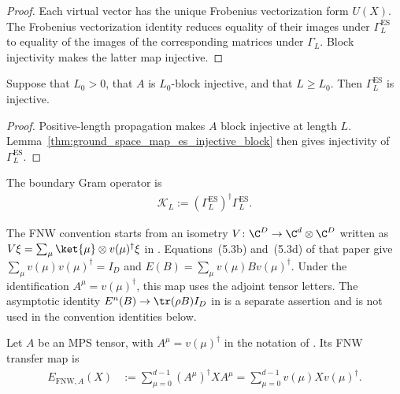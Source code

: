 \begin{proof}
    \leanok
    Each virtual vector has the unique Frobenius vectorization form $U(X)$.
    The Frobenius vectorization identity reduces equality of their images under
    $\Gamma_L^{\mathrm{ES}}$ to equality of the images of the corresponding
    matrices under $\Gamma_L$.  Block injectivity makes the latter map
    injective.
\end{proof}

\begin{lemma}
    \label{thm:ground_space_map_es_injective_block_of_le}
    \leanok
    Suppose that $L_0>0$, that $A$ is $L_0$-block injective, and that
    $L\ge L_0$.  Then $\Gamma_L^{\mathrm{ES}}$ is injective.
\end{lemma}

\begin{proof}
    \leanok
    Positive-length propagation makes $A$ block injective at length $L$.
    Lemma~\ref{thm:ground_space_map_es_injective_block} then gives injectivity of
    $\Gamma_L^{\mathrm{ES}}$.
\end{proof}

\begin{definition}
    \label{def:ground_space_gram}
    \leanok
    The boundary Gram operator is
    \begin{align}
        \mathcal K_L
        :=(\Gamma_L^{\mathrm{ES}})^\dagger\Gamma_L^{\mathrm{ES}}.
    \end{align}
\end{definition}

The FNW convention starts from an isometry
$V\colon\C^D\to\C^d\otimes\C^D$ written as
$V\xi=\sum_\mu\ket{\mu}\otimes v(\mu)^\dagger\xi$ in
\cite[Equation~(5.2)]{Fannes1992Finitely}. Equations~(5.3b) and~(5.3d)
of that paper give
$\sum_\mu v(\mu)v(\mu)^\dagger=I_D$ and
$E(B)=\sum_\mu v(\mu)Bv(\mu)^\dagger$. Under the identification
$A^\mu=v(\mu)^\dagger$, this map uses the adjoint tensor letters. The
asymptotic identity
$E^n(B)\to\tr(\rho B)I_D$ in
\cite[Equation~(5.1)]{Fannes1992Finitely} is a separate assertion and is not
used in the convention identities below.

\begin{definition}
    \label{def:fnw_transfer_map}
    \leanok
    Let $A$ be an MPS tensor, with $A^\mu=v(\mu)^\dagger$ in the notation of
    \cite[Equations~(5.2)--(5.3)]{Fannes1992Finitely}. Its FNW transfer map is
    \begin{align}
        E_{\mathrm{FNW},A}(X)
         & :=\sum_{\mu=0}^{d-1}(A^\mu)^\dagger X A^\mu
        =\sum_{\mu=0}^{d-1}v(\mu)Xv(\mu)^\dagger.
        \label{eq:fnw_transfer_map}
    \end{align}
\end{definition}

